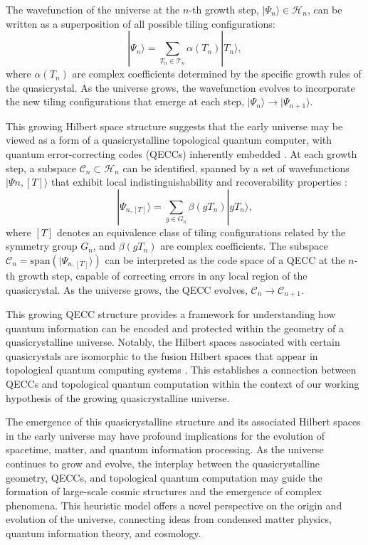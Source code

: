 \documentclass{article}
\begin{document}
The wavefunction of the universe at the $n$-th growth step, $|\Psi_n\rangle \in \mathcal{H}_n$, can be written as a superposition of all possible tiling configurations:
\begin{equation}
|\Psi_n\rangle = \sum_{T_n \in \mathcal{T}_n} \alpha(T_n) |T_n\rangle,
\end{equation}
where $\alpha(T_n)$ are complex coefficients determined by the specific growth rules of the quasicrystal. As the universe grows, the wavefunction evolves to incorporate the new tiling configurations that emerge at each step, $|\Psi_n\rangle \rightarrow |\Psi_{n+1}\rangle$.

This growing Hilbert space structure suggests that the early universe may be viewed as a form of a quasicrystalline topological quantum computer, with quantum error-correcting codes (QECCs) inherently embedded \cite{Li:2023nkr}. At each growth step, a subspace $\mathcal{C}_n \subset \mathcal{H}_n$ can be identified, spanned by a set of wavefunctions ${|\Psi{n,[T]}\rangle}$ that exhibit local indistinguishability and recoverability properties \cite{Li:2023nkr}:
\begin{equation}
|\Psi_{n,[T]}\rangle = \sum_{g \in G_n} \beta(g T_n) |g T_n\rangle,
\end{equation}
where $[T]$ denotes an equivalence class of tiling configurations related by the symmetry group $G_n$, and $\beta(g T_n)$ are complex coefficients. The subspace $\mathcal{C}_n = \text{span}({|\Psi_{n,[T]}\rangle})$ can be interpreted as the code space of a QECC at the $n$-th growth step, capable of correcting errors in any local region of the quasicrystal. As the universe grows, the QECC evolves, $\mathcal{C}_n \rightarrow \mathcal{C}_{n+1}$.

This growing QECC structure provides a framework for understanding how quantum information can be encoded and protected within the geometry of a quasicrystalline universe. Notably, the Hilbert spaces associated with certain quasicrystals are isomorphic to the fusion Hilbert spaces that appear in topological quantum computing systems \cite{Amaral2022sy}. This establishes a connection between QECCs and topological quantum computation within the context of our working hypothesis of the growing quasicrystalline universe.

The emergence of this quasicrystalline structure and its associated Hilbert spaces in the early universe may have profound implications for the evolution of spacetime, matter, and quantum information processing. As the universe continues to grow and evolve, the interplay between the quasicrystalline geometry, QECCs, and topological quantum computation may guide the formation of large-scale cosmic structures and the emergence of complex phenomena. This heuristic model offers a novel perspective on the origin and evolution of the universe, connecting ideas from condensed matter physics, quantum information theory, and cosmology.
\end{document}
